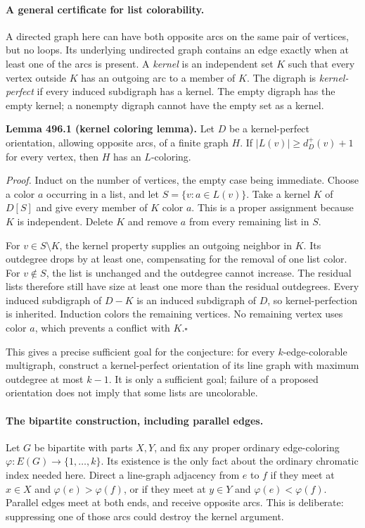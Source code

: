 \documentclass[11pt]{article}
\begin{document}
\paragraph{A general certificate for list colorability.}
A directed graph here can have both opposite arcs on the same pair of
vertices, but no loops. Its underlying undirected graph contains an edge
exactly when at least one of the arcs is present. A \emph{kernel} is an
independent set $K$ such that every vertex outside $K$ has an outgoing
arc to a member of $K$. The digraph is \emph{kernel-perfect} if every
induced subdigraph has a kernel. The empty digraph has the empty kernel;
a nonempty digraph cannot have the empty set as a kernel.

\textbf{Lemma 496.1 (kernel coloring lemma).}
Let $D$ be a kernel-perfect orientation, allowing opposite arcs, of a
finite graph $H$. If $|L(v)|\geq d_D^+(v)+1$ for every vertex, then $H$
has an $L$-coloring.

\emph{Proof.}
Induct on the number of vertices, the empty case being immediate. Choose
a color $a$ occurring in a list, and let $S=\{v:a\in L(v)\}$. Take a
kernel $K$ of $D[S]$ and give every member of $K$ color $a$. This is a
proper assignment because $K$ is independent. Delete $K$ and remove
$a$ from every remaining list in $S$.

For $v\in S\setminus K$, the kernel property supplies an outgoing
neighbor in $K$. Its outdegree drops by at least one, compensating for
the removal of one list color. For $v\notin S$, the list is unchanged
and the outdegree cannot increase. The residual lists therefore still
have size at least one more than the residual outdegrees. Every induced
subdigraph of $D-K$ is an induced subdigraph of $D$, so kernel-perfection
is inherited. Induction colors the remaining vertices. No remaining
vertex uses color $a$, which prevents a conflict with $K$.\hfill$\square$

This gives a precise sufficient goal for the conjecture: for every
$k$-edge-colorable multigraph, construct a kernel-perfect orientation of
its line graph with maximum outdegree at most $k-1$. It is only a
sufficient goal; failure of a proposed orientation does not imply that
some lists are uncolorable.

\paragraph{The bipartite construction, including parallel edges.}
Let $G$ be bipartite with parts $X,Y$, and fix any proper ordinary
edge-coloring $\varphi:E(G)\to\{1,\ldots,k\}$. Its existence is the
only fact about the ordinary chromatic index needed here. Direct a
line-graph adjacency from $e$ to $f$ if they meet at $x\in X$ and
$\varphi(e)>\varphi(f)$, or if they meet at $y\in Y$ and
$\varphi(e)<\varphi(f)$. Parallel edges meet at both ends, and receive
opposite arcs. This is deliberate: suppressing one of those arcs could
destroy the kernel argument.
\end{document}
